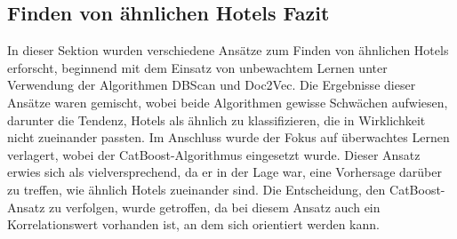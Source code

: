 \subsection{Finden von ähnlichen Hotels Fazit}
\label{subsec:similar_fazit}
In dieser Sektion wurden verschiedene Ansätze zum Finden von ähnlichen Hotels erforscht, beginnend mit dem Einsatz von unbewachtem Lernen unter Verwendung der Algorithmen DBScan und Doc2Vec. Die Ergebnisse dieser Ansätze waren gemischt, wobei beide Algorithmen gewisse Schwächen aufwiesen, darunter die Tendenz, Hotels als ähnlich zu klassifizieren, die in Wirklichkeit nicht zueinander passten.
\newline
\newline
Im Anschluss wurde der Fokus auf überwachtes Lernen verlagert, wobei der CatBoost-Algorithmus eingesetzt wurde. Dieser Ansatz erwies sich als vielversprechend, da er in der Lage war, eine Vorhersage darüber zu treffen, wie ähnlich Hotels zueinander sind. Die Entscheidung, den CatBoost-Ansatz zu verfolgen, wurde getroffen, da bei diesem Ansatz auch ein Korrelationswert vorhanden ist, an dem sich orientiert werden kann.